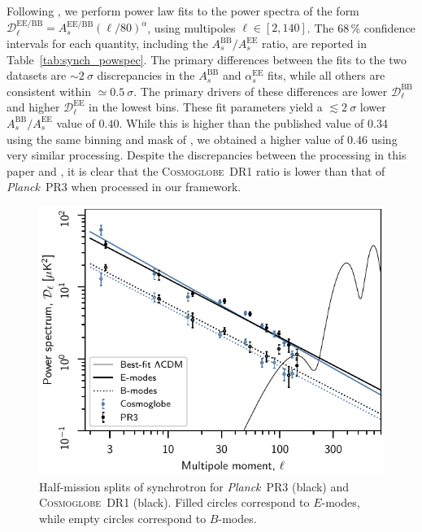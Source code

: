 \documentclass[twocolumn]{../../common/aa}
\def\Planck{\emph{Planck}}
\newcommand{\cosmoglobe}{\textsc{Cosmoglobe}}
\begin{document}
Following \citet{planck2016-l04}, we perform power law fits to the power spectra of the form $\mathcal D_\ell^\mathrm{EE/BB}=A_s^{\mathrm{EE/BB}}(\ell/80)^\alpha$, using multipoles $\ell\in[2,140]$. The 68\,\% confidence intervals for each quantity, including the $A_s^\mathrm{BB}/A_s^\mathrm{EE}$ ratio, are reported in Table~\ref{tab:synch_powspec}. The primary differences between the fits to the two datasets are $\sim2~\sigma$ discrepancies in the $A_s^\mathrm{BB}$ and $\alpha_s^\mathrm{EE}$ fits, while all others are consistent within $\simeq0.5~\sigma$. The primary drivers of these differences are lower $\mathcal D_\ell^\mathrm{BB}$ and higher $\mathcal D_\ell^\mathrm{EE}$ in the lowest bins.
These fit parameters yield a $\lesssim2~\sigma$ lower $A_s^\mathrm{BB}/A_s^\mathrm{EE}$ value of $0.40$. While this is higher than the published value of 0.34 using the same binning and mask of \citet{planck2016-l04}, we obtained a higher value of 0.46 using very similar processing. Despite the discrepancies between the processing in this paper and \citet{planck2016-l04}, it is clear that the \cosmoglobe\ DR1 ratio is lower than that of \Planck\ PR3 when processed in our framework.

\begin{figure}
        \centering
	\includegraphics[width=\linewidth]{figures/cls_synch_ratio.pdf}
        \caption{
		Half-mission splits of synchrotron for \Planck\ PR3 (black) and \cosmoglobe\ DR1 (black). Filled circles correspond to $E$-modes, while empty circles correspond to $B$-modes.
        }
        \label{fig:spectra}
\end{figure}
\end{document}
